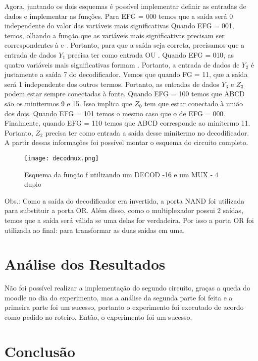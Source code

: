 \documentclass[12pt]{article}
\begin{document}
Agora, juntando os dois esquemas é possível implementar definir as entradas de dados e implementar as funções. Para EFG = 000 temos que a saída será 0 independente do valor das variáveis mais significativas Quando EFG = 001, temos, olhando a função  que as variáveis mais significativas precisam ser correspondentes à  e . Portanto, para que a saída seja correta, precisamos que a entrada de dados $Y_{1}$ precisa ter como entrada  OU . Quando EFG = 010, as quatro variáveis mais significativas formam . Portanto, a entrada de dados de $Y_{2}$ é justamente a saída 7 do decodificador. Vemos que quando FG = 11, que a saída será 1 independente dos outros termos. Portanto, as entradas de dados $Y_{3}$ e $Z_{3}$ podem estar sempre conectadas à fonte. Quando EFG = 100 temos que ABCD são os minitermos 9 e 15. Isso implica que $Z_{0}$ tem que estar conectado à união dos dois. Quando EFG = 101 temos o mesmo caso que o de EFG = 000. Finalmente, quando EFG = 110 temos que ABCD corresponde ao minitermo 11. Portanto, $Z_{2}$ precisa ter como entrada a saída desse minitermo no decodificador. A partir dessas informações foi possível montar o esquema do circuito completo.

\begin{figure}[H]
	\centering
	\texttt{[image: decodmux.png]}
	\caption{Esquema da função f utilizando um DECOD -16 e um MUX - 4 duplo}
	\label{fig:decodmux}
\end{figure}

Obs.: Como a saída do decodificador era invertida, a porta NAND foi utilizada para substituir a porta OR. Além disso, como o multiplexador possui 2 saídas, temos que a saída será válida se uma delas for verdadeira. Por isso a porta OR foi utilizada ao final: para transformar as duas saídas em uma.

\section{Análise dos Resultados}
\label{sec:Resultados}

Não foi possível realizar a implementação do segundo circuito, graças a queda do moodle no dia do experimento, mas a análise da segunda parte foi feita e a primeira parte foi um sucesso, portanto o experimento foi executado de acordo como pedido no roteiro. Então, o experimento foi um sucesso.

\section{Conclusão}
\label{sec:Conclusao}
\end{document}
